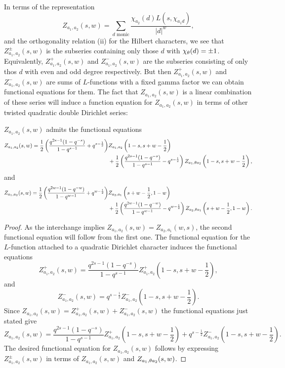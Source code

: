 \documentclass[12pt,reqno,oneside]{amsart}
\begin{document}
    In terms of the representation
    \[
        Z_{a_{1},a_{2}}(s,w) = \sum_{\text{$d$ monic}}\frac{\chi_{a_{2}}(d)L(s,\chi_{a_{1}d})}{|d|^{w}},
    \]
    and the orthogonality relation (ii) for the Hilbert characters, we see that $Z_{a_{1},a_{2}}^{\pm}(s,w)$ is the subseries containing only those $d$ with $\chi_{\theta}(d) = \pm 1$. Equivalently, $Z_{a_{1},a_{2}}^{+}(s,w)$ and $Z_{a_{1},a_{2}}^{-}(s,w)$ are the subseries consisting of only thos $d$ with even and odd degree respectively. But then $Z_{a_{1},a_{2}}^{+}(s,w)$ and $Z_{a_{1},a_{2}}^{-}(s,w)$ are sums of $L$-functions with a fixed gamma factor we can obtain functional equations for them. The fact that $Z_{a_{1},a_{2}}(s,w)$ is a linear combination of these series will induce a function equation for $Z_{a_{1},a_{2}}(s,w)$ in terms of other twisted quadratic double Dirichlet series:

    \begin{theorem}\label{thm:double_Dirichlet_series_functional_equation}
        $Z_{a_{1},a_{2}}(s,w)$ admits the functional equations
        \begin{align*}
            Z_{a_{1},a_{2}}(s,w) = \frac{1}{2}\left(\frac{q^{2s-1}(1-q^{-s})}{1-q^{s-1}}+q^{s-\frac{1}{2}}\right)&Z_{a_{1},a_{2}}\left(1-s,s+w-\frac{1}{2}\right) \\
            &+\frac{1}{2}\left(\frac{q^{2s-1}(1-q^{-s})}{1-q^{s-1}}-q^{s-\frac{1}{2}}\right)Z_{a_{1},\theta a_{2}}\left(1-s,s+w-\frac{1}{2}\right),
        \end{align*}
        and
        \begin{align*}
            Z_{a_{1},a_{2}}(s,w) = \frac{1}{2}\left(\frac{q^{2w-1}(1-q^{-w})}{1-q^{w-1}}+q^{w-\frac{1}{2}}\right)&Z_{a_{2},a_{1}}\left(s+w-\frac{1}{2},1-w\right) \\
            &+\frac{1}{2}\left(\frac{q^{2w-1}(1-q^{-w})}{1-q^{w-1}}-q^{w-\frac{1}{2}}\right)Z_{a_{2},\theta a_{1}}\left(s+w-\frac{1}{2},1-w\right).
        \end{align*}
    \end{theorem}
    \begin{proof}
        As the interchange implies $Z_{a_{1},a_{2}}(s,w) = Z_{a_{2},a_{1}}(w,s)$, the second functional equation will follow from the first one. The functional equation for the $L$-function attached to a quadratic Dirichlet character induces the functional equations
        \[
            Z_{a_{1},a_{2}}^{+}(s,w) = \frac{q^{2s-1}(1-q^{-s})}{1-q^{s-1}}Z_{a_{1},a_{2}}^{+}\left(1-s,s+w-\frac{1}{2}\right),
        \]
        and
        \[
            Z_{a_{1},a_{2}}^{-}(s,w) = q^{s-\frac{1}{2}}Z_{a_{1},a_{2}}^{-}\left(1-s,s+w-\frac{1}{2}\right).
        \]
        Since $Z_{a_{1},a_{2}}(s,w) = Z_{a_{1},a_{2}}^{+}(s,w)+Z_{a_{1},a_{2}}^{-}(s,w)$ the functional equations just stated give
        \[
            Z_{a_{1},a_{2}}(s,w) = \frac{q^{2s-1}(1-q^{-s})}{1-q^{s-1}}Z_{a_{1},a_{2}}^{+}\left(1-s,s+w-\frac{1}{2}\right)+q^{s-\frac{1}{2}}Z_{a_{1},a_{2}}^{-}\left(1-s,s+w-\frac{1}{2}\right).
        \]
        The desired functional equation for $Z_{a_{1},a_{2}}(s,w)$ follows by expressing $Z_{a_{1},a_{2}}^{\pm}(s,w)$ in terms of $Z_{a_{1},a_{2}}(s,w)$ and $Z_{a_{1},\theta a_{2}}(s,w)$.
    \end{proof}
\end{document}
